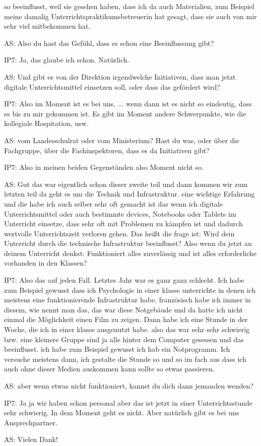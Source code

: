 \documentclass[fontsize=11pt,paper=a4]{scrbook}
\begin{document}
{\begin{itemize*}
so beeinflusst, weil sie gesehen haben, dass ich
da auch Materialien, zum Beispiel meine
damalig Unterrichtspraktikumsbetreuerin hat gesagt, dass
sie auch von mir sehr viel mitbekommen hat.
\item[AS:] Also du hast das Gefühl, dass es schon eine Beeinflussung gibt?
\item[IP7:] Ja, das glaube ich schon. Natürlich.
\item[AS:] Und gibt es von der Direktion irgendwelche Initiativen,
dass man jetzt digitale
Unterrichtsmittel einsetzen soll, oder
dass das gefördert wird?
\item[IP7:] Also im Moment ist es bei uns, ... wenn dann ist es nicht so eindeutig, dass
es bis zu mir gekommen ist. Es gibt im Moment
andere Schwerpunkte, wie die kollegiale
Hospitation, usw.
\item[AS:] vom Landesschulrat oder vom
Ministerium? Hast du was, oder über die Fachgruppe, 
über die Fachinspektoren,  dass es da Initiativen gibt?
\item[IP7:] Also in
meinen beiden Gegenständen also Moment
nicht so.
\item[AS:] Gut das war eigentlich schon
dieser zweite teil
und dann kommen wir zum letzten teil da
geht es um die Technik und Infrastruktur.
eine wichtige Erfahrung und die habe ich
auch selber sehr oft gemacht ist das
wenn ich digitale Unterrichtsmittel oder
auch bestimmte devices, Notebooks oder
Tablets im Unterricht einsetze, dass sehr oft mit Problemen zu kämpfen ist und
dadurch wertvolle Unterrichtszeit
verloren gehen. Das heißt die frage ist:
Wird dein Unterricht durch die technische
Infrastruktur beeinflusst? Also wenn du
jetzt an deinem Unterricht denkst:
Funktioniert alles zuverlässig und ist
alles erforderliche vorhanden in den Klassen?
\item[IP7:] Also das auf jeden Fall. Letztes Jahr
war es ganz ganz schlecht. Ich habe zum
Beispiel gewusst dass ich Psychologie in
einer klasse unterrichte in denen ich meistens eine funktionierende Infrastruktur habe.
französisch habe ich immer in diesem,
wie nennt man das, das war diese Notgebäude und da hatte ich nicht
einmal die Möglichkeit einen Film zu
zeigen. Dann habe ich eine Stunde in der
Woche, die ich in einer klasse ausgenutzt
habe.  also das war sehr sehr schwierig
bzw. eine kleinere Gruppe sind ja alle hinter
dem Computer gesessen und das
beeinflusst. ich habe zum Beispiel
gewusst ich hab ein Notprogramm. Ich versuche meistens dann, ich gestalte die Stunde
so und so im fach aus dass ich auch ohne
dieser Medien auskommen kann sollte so etwas passieren.
\item[AS:] aber wenn etwas nicht funktioniert, 
kannst du dich dann jemanden wenden?
\item[IP7:] Ja ja wir haben schon personal
aber das ist jetzt in einer
Unterrichtsstunde sehr schwierig. In dem Moment geht es nicht. Aber natürlich
gibt es bei uns Ansprechpartner.
\item[AS:] Vielen Dank!
\end{itemize*} 
}
\end{document}
